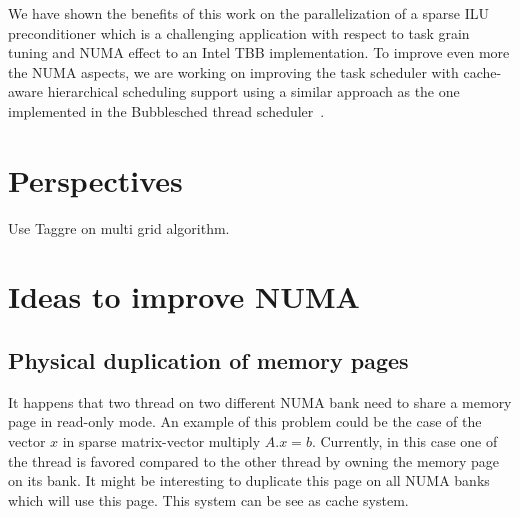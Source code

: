 We have shown the benefits of this work on the parallelization of a sparse ILU
preconditioner which is a challenging application with respect to task grain tuning and NUMA effect
to an Intel TBB implementation.
%
To improve even more the NUMA aspects, we are working on improving the task
scheduler with cache-aware hierarchical scheduling support using a similar
approach as the one implemented in the Bubblesched thread scheduler~\cite{bubblesched}.



\section{Perspectives}

Use Taggre on multi grid algorithm.


\section{Ideas to improve NUMA}
\subsection{Physical duplication of memory pages}
It happens that two thread on two different NUMA bank need to share a
memory page in read-only mode.
An example of this problem could be the case of the vector $x$ in sparse
matrix-vector multiply $A.x=b$.
Currently, in this case one of the thread is favored compared to the other
thread by owning the memory page on its bank.
It might be interesting to duplicate this page on all NUMA banks
which will use this page.
This system can be see as cache system.
